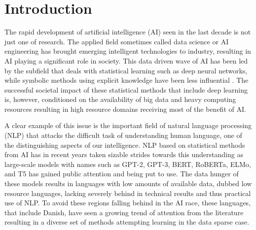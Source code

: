 \documentclass[main.tex]{subfiles}
\begin{document}
\chapter{Introduction}
The rapid development of artificial intelligence (AI) seen in the last decade is not just one of research.
The applied field sometimes called data science or AI engineering has brought emerging intelligent technologies to industry, resulting in AI playing a significant role in society.
This data driven wave of AI has been led by the subfield that deals with statistical learning such as deep neural networks, while symbolic methods using explicit knowledge have been less influential \cite[p. 1]{lecun2015deep}.
The successful societal impact of these statistical methods that include deep learning is, however, conditioned on the availability of big data and heavy computing resources resulting in high resource domains receiving most of the benefit of AI.

A clear example of this issue is the important field of natural language processing (NLP) that attacks the difficult task of understanding human language, one of the distinguishing aspects of our intelligence.
NLP based on statistical methods from AI has in recent years taken sizable strides towards this understanding as large-scale models with names such as GPT-2, GPT-3, BERT, RoBERTa, ELMo, and T5 has gained public attention and being put to use.
The data hunger of these models results in languages with low amounts of available data, dubbed low resource languages, lacking severely behind in technical results and thus practical use of NLP.
To avoid these regions falling behind in the AI race, these languages, that include Danish, have seen a growing trend of attention from the literature resulting in a diverse set of methods attempting learning in the data sparse case. \cite{hedderich2021survey}
\end{document}
